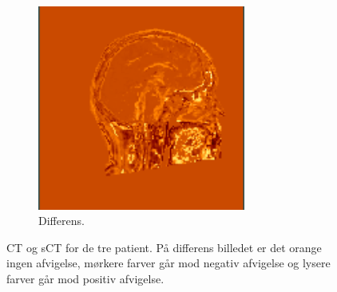 \begin{figure}
\begin{subfigure}{0.3\textwidth}
        \includegraphics[width=0.75\textwidth]{colager/over_tid_sct/over_tid_sct_210445_sub.png}
        \caption{Differens.}
        \label{col:over_time_sct_pat3_sub}
    \end{subfigure}
    \caption{CT og sCT for de tre patient. På differens billedet er det orange ingen afvigelse, mørkere farver går mod negativ afvigelse og lysere farver går mod positiv afvigelse.}
    \label{col:over_time_sct}
\end{figure}

